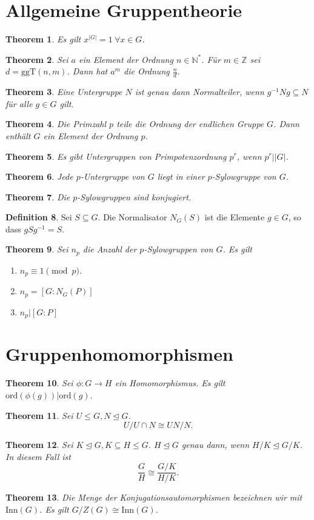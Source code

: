 \documentclass[prb,12pt]{revtex4-2}
\newtheorem{Theorem}{Theorem}
\theoremstyle{definition}
\theoremstyle{definition}
\newtheorem{Definition}[Theorem]{Definition}
\newcommand{\N}{\mathbb{N}}
\newcommand{\Z}{\mathbb{Z}}
\begin{document}
	\section{Allgemeine Gruppentheorie}
	\begin{Theorem}
		Es gilt $x^{|G|}=1~\forall x\in G$.
	\end{Theorem}
	\begin{Theorem}
		Sei $a$ ein Element der Ordnung $n\in \N^*$. F\"{u}r $m\in \Z$ sei $d=\text{ggT}(n,m)$. Dann hat $a^m$ die Ordnung $\frac{n}{d}$.
	\end{Theorem}
	\begin{Theorem}
		Eine Untergruppe $N$ ist genau dann Normalteiler, wenn $g^{-1}Ng\subseteq N $ f\"{u}r alle $g\in G$ gilt.
	\end{Theorem}
	\begin{Theorem}
		Die Primzahl $p$ teile die Ordnung der endlichen Gruppe $G$. Dann enthält $G$ ein Element der Ordnung $p$.
	\end{Theorem}
	\begin{Theorem}
		Es gibt Untergruppen von Primpotenzordnung $p^r$, wenn $p^r| |G|$.
	\end{Theorem}
	\begin{Theorem}
		Jede $p$-Untergruppe von $G$ liegt in einer $p$-Sylowgruppe von $G$.
	\end{Theorem}
	\begin{Theorem}
		Die $p$-Sylowgruppen sind konjugiert.
	\end{Theorem}
	\begin{Definition}
		Sei $S\subseteq G$. Die Normalisator $N_G(S)$ ist die Elemente $g\in G$, so dass $gSg^{-1}=S$.
	\end{Definition}
	\begin{Theorem}
		Sei $n_p$ die Anzahl der $p$-Sylowgruppen von $G$. Es gilt
		\begin{enumerate}
			\item $n_p\equiv 1\pmod{p}$.
			\item $n_p=[G: N_G(P)]$ 
			\item $n_p | [G:P]$
		\end{enumerate}
	\end{Theorem}
	\section{Gruppenhomomorphismen}
	\begin{Theorem}
		Sei $\phi:G\to H$ ein Homomorphismus. Es gilt $\text{ord}(\phi(g))|\text{ord}(g)$.
	\end{Theorem}
	\begin{Theorem}
		Sei $U\le G,N\trianglelefteq G$. 
		\[
		U / U\cap N \cong UN / N
		.\] 
	\end{Theorem}
	\begin{Theorem}
		Sei $K\trianglelefteq G, K\subseteq H\le G$. $H\trianglelefteq G$ genau dann, wenn $H / K \trianglelefteq G / K$. In diesem Fall ist
		\[
		\frac{G}{H}\cong \frac{G / K}{H / K}
		.\] 
	\end{Theorem}
	\begin{Theorem}
		Die Menge der Konjugationsautomorphismen bezeichnen wir mit $\text{Inn}(G)$. Es gilt $G / Z(G)\cong \text{Inn}(G)$.
	\end{Theorem}
\end{document}
